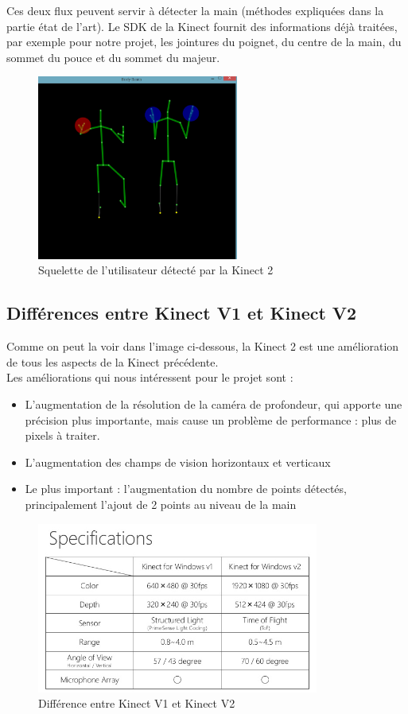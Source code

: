 Ces deux flux peuvent servir à détecter la main (méthodes expliquées dans la partie état de l'art).
Le SDK de la Kinect fournit des informations déjà traitées, 
par exemple pour notre projet, les jointures du poignet, du centre de la main, du sommet du pouce et du sommet du majeur.

\begin{figure}[H]
\center
\includegraphics[width=250px]{images/kinec2_skel.png}
\caption{Squelette de l'utilisateur détecté par la Kinect 2}
\label{fig:skeleton_kinect2}
\end{figure}

\subsection{Différences entre Kinect V1 et Kinect V2}

Comme on peut la voir dans l'image ci-dessous, la Kinect 2 est une amélioration de tous les aspects de la Kinect précédente.\\

Les améliorations qui nous intéressent pour le projet sont : 
\begin{itemize}
 \item L'augmentation de la résolution de la caméra de profondeur, qui apporte une précision plus importante, mais cause un problème de performance : plus de pixels à traiter.
 \item L'augmentation des champs de vision horizontaux et verticaux
 \item Le plus important : l'augmentation du nombre de points détectés, principalement l'ajout de 2 points au niveau de la main
\end{itemize}

\begin{figure}[H]
  \begin{center}
    \includegraphics[width=350px]{images/kinect-v2-introduction-and-tutorial-8-638.jpg}
    \caption{Différence entre Kinect V1 et Kinect V2}
    \label{fig:kinect1vs2}
  \end{center}
\end{figure}

